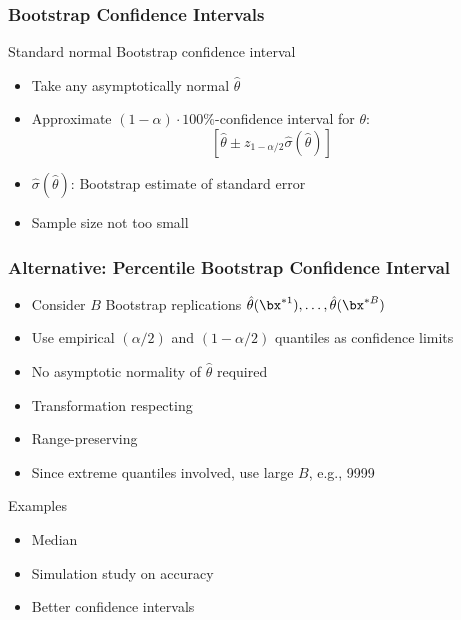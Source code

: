 \begin{frame}
	\frametitle{Bootstrap Confidence Intervals}
	\begin{block}{Standard normal Bootstrap confidence interval}
		\begin{itemize}
			\item Take any asymptotically normal $\hat \theta$
			\item Approximate $(1-\alpha)\cdot 100\%$-confidence interval for $\theta$:
				$$
		 			[\hat \theta \pm z_{1-\alpha/2} \hat \sigma(\hat\theta)]
				$$
			\item $\hat \sigma(\hat\theta)$: Bootstrap estimate of standard error
			\item Sample size not too small
		\end{itemize}
	\end{block}
	
	\vfill
	
	\begin{example}
	\end{example}
\end{frame}

\begin{frame}
	\frametitle{Alternative: Percentile Bootstrap Confidence Interval}
	\begin{itemize}
		\item Consider $B$ Bootstrap replications $\hat \theta(\bx^{*1}), \dots, \hat \theta(\bx^{*B})$
		\item Use empirical $(\alpha/2)$ and $(1-\alpha/2)$ quantiles as confidence limits
		\item No asymptotic normality of $\hat\theta$ required
		\item Transformation respecting
		\item Range-preserving
		\item Since extreme quantiles involved, use large $B$, e.g., 9999
	\end{itemize}
	
	\begin{exampleblock}{Examples}
	\begin{itemize}
		\item Median
		\item Simulation study on accuracy
		\item Better confidence intervals
	\end{itemize}
	\end{exampleblock}
\end{frame}

